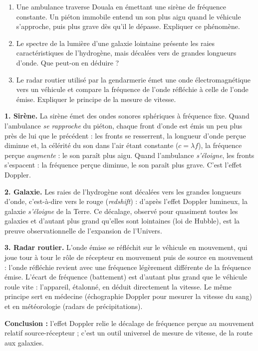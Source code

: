 \documentclass[11pt]{article}
\newcommand{\cle}[1]{{\popxbold\color{popdark}#1}}
\begin{document}
\begin{exoresolu}
\begin{enumerate}
\item Une ambulance traverse Douala en émettant une sirène de fréquence constante. Un piéton immobile entend un son plus aigu quand le véhicule s'approche, puis plus grave dès qu'il le dépasse. Expliquer ce phénomène.
\item Le spectre de la lumière d'une galaxie lointaine présente les raies caractéristiques de l'hydrogène, mais décalées vers de grandes longueurs d'onde. Que peut-on en déduire ?
\item Le radar routier utilisé par la gendarmerie émet une onde électromagnétique vers un véhicule et compare la fréquence de l'onde réfléchie à celle de l'onde émise. Expliquer le principe de la mesure de vitesse.
\end{enumerate}
\tcblower
\textbf{1. Sirène.} La sirène émet des ondes sonores sphériques à fréquence fixe. Quand l'ambulance \emph{se rapproche} du piéton, chaque front d'onde est émis un peu plus près de lui que le précédent : les fronts se resserrent, la longueur d'onde perçue diminue et, la célérité du son dans l'air étant constante ($c = \lambda f$), la fréquence perçue \emph{augmente} : le son paraît plus aigu. Quand l'ambulance \emph{s'éloigne}, les fronts s'espacent : la fréquence perçue diminue, le son paraît plus grave. C'est l'\cle{effet Doppler}.

\textbf{2. Galaxie.} Les raies de l'hydrogène sont décalées vers les grandes longueurs d'onde, c'est-à-dire vers le rouge (\emph{redshift}) : d'après l'effet Doppler lumineux, la galaxie \emph{s'éloigne} de la Terre. Ce décalage, observé pour quasiment toutes les galaxies et d'autant plus grand qu'elles sont lointaines (loi de Hubble), est la preuve observationnelle de l'\cle{expansion de l'Univers}.

\textbf{3. Radar routier.} L'onde émise se réfléchit sur le véhicule en mouvement, qui joue tour à tour le rôle de récepteur en mouvement puis de source en mouvement : l'onde réfléchie revient avec une fréquence légèrement différente de la fréquence émise. L'écart de fréquence (battement) est d'autant plus grand que le véhicule roule vite : l'appareil, étalonné, en déduit directement la vitesse. Le même principe sert en médecine (échographie Doppler pour mesurer la vitesse du sang) et en météorologie (radars de précipitations).

\textbf{Conclusion :} l'effet Doppler relie le décalage de fréquence perçue au mouvement relatif source-récepteur ; c'est un outil universel de mesure de vitesse, de la route aux galaxies.
\end{exoresolu}
\end{document}
